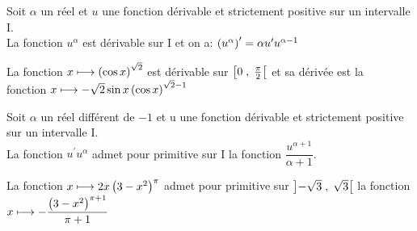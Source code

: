 \begin{property}
Soit $\alpha $ un réel et  $u$  une fonction  dérivable et strictement positive sur un intervalle I. \\La fonction \;$ u^{\alpha} $\; est dérivable sur I et on a:\; $\left( u^{\alpha}\right)^{\prime}=\alpha u^{\prime}u^{\alpha -1} $
\end{property}
\begin{example}
La fonction \;$ x\longmapsto  \left(\cos x\right)^{\sqrt{2}} $  est dérivable sur \;$ \left[0 \;,\; \frac{\pi}{2}\right[ $\;   et sa dérivée est la \\ fonction \;$ x\longmapsto -\sqrt{2}\sin x \left(\cos x\right)^{\sqrt{2}-1}$

\end{example}

\begin{property}
Soit $\alpha $ un réel  différent de \;$ -1 $\;   et  u  une fonction  dérivable et  strictement positive sur un intervalle I. \\La fonction \;                                       $ u^{\prime}u^{\alpha} $\;   admet pour primitive sur I la fonction \;  $ \dfrac{u^{\alpha +1}}{\alpha+1} $.
\end{property}
\begin{example}
La fonction \;$ x\longmapsto 2x \left(3-x^{2}\right)^{\pi} $   admet pour primitive sur $ \left]-\sqrt{3} \;,\; \sqrt{3}\right[ $\;    la fonction \\ $ x\longmapsto -\dfrac{\left(3-x^{2}\right)^{\pi+1}}{\pi+1} $
\end{example}


